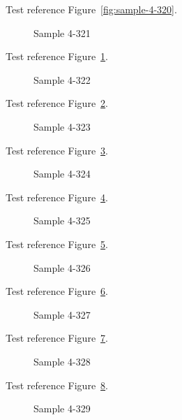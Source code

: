 Test reference Figure~\ref{fig:sample-4-320}.

\begin{figure}[tbhp]
\caption{Sample 4-321}
\label{fig:sample-4-321}
\end{figure}

Test reference Figure~\ref{fig:sample-4-321}.

\begin{figure}[tbhp]
\caption{Sample 4-322}
\label{fig:sample-4-322}
\end{figure}

Test reference Figure~\ref{fig:sample-4-322}.

\begin{figure}[tbhp]
\caption{Sample 4-323}
\label{fig:sample-4-323}
\end{figure}

Test reference Figure~\ref{fig:sample-4-323}.

\begin{figure}[tbhp]
\caption{Sample 4-324}
\label{fig:sample-4-324}
\end{figure}

Test reference Figure~\ref{fig:sample-4-324}.

\begin{figure}[tbhp]
\caption{Sample 4-325}
\label{fig:sample-4-325}
\end{figure}

Test reference Figure~\ref{fig:sample-4-325}.

\begin{figure}[tbhp]
\caption{Sample 4-326}
\label{fig:sample-4-326}
\end{figure}

Test reference Figure~\ref{fig:sample-4-326}.

\begin{figure}[tbhp]
\caption{Sample 4-327}
\label{fig:sample-4-327}
\end{figure}

Test reference Figure~\ref{fig:sample-4-327}.

\begin{figure}[tbhp]
\caption{Sample 4-328}
\label{fig:sample-4-328}
\end{figure}

Test reference Figure~\ref{fig:sample-4-328}.

\begin{figure}[tbhp]
\caption{Sample 4-329}
\label{fig:sample-4-329}
\end{figure}

